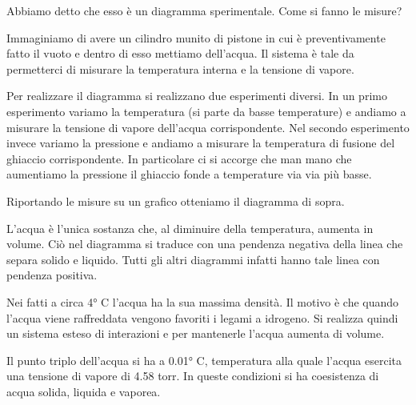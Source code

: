 Abbiamo detto che esso è un diagramma sperimentale. Come si fanno le misure?

Immaginiamo di avere un cilindro munito di pistone in cui è preventivamente fatto il vuoto e dentro di esso mettiamo dell'acqua. Il sistema è tale da permetterci di misurare la temperatura interna e la tensione di vapore.


Per realizzare il diagramma si realizzano due esperimenti diversi. In un primo esperimento variamo la temperatura (si parte da basse temperature) e andiamo a misurare la tensione di vapore dell'acqua corrispondente. Nel secondo esperimento invece variamo la pressione e andiamo a misurare la temperatura di fusione del ghiaccio corrispondente. In particolare ci si accorge che man mano che aumentiamo la pressione il ghiaccio fonde a temperature via via più basse.

Riportando le misure su un grafico otteniamo il diagramma di sopra.

L'acqua è l'unica sostanza che, al diminuire della temperatura, aumenta in volume. Ciò nel diagramma si traduce con una pendenza negativa della linea che separa solido e liquido. Tutti gli altri diagrammi infatti hanno tale linea con pendenza positiva.

Nei fatti a circa 4° C l'acqua ha la sua massima densità. Il motivo è che quando l'acqua viene raffreddata vengono favoriti i legami a idrogeno. Si realizza quindi un sistema esteso di interazioni e per mantenerle l'acqua aumenta di volume.

Il punto triplo dell'acqua si ha a 0.01° C, temperatura alla quale l'acqua esercita una tensione di vapore di 4.58 torr. In queste condizioni si ha coesistenza di acqua solida, liquida e vaporea.
